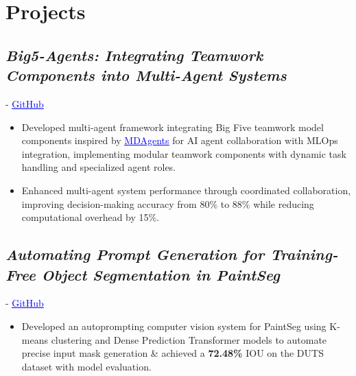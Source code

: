 \section{Projects}
\subsection{\sl {\bfseries Big5-Agents: Integrating Teamwork Components into Multi-Agent Systems}}   -
\href{https://github.com/PranavMishra17/Big5-Agents}{\textcolor{blue}{\underline{GitHub }}}
\begin{itemize}
\item Developed multi-agent framework integrating Big Five teamwork model components inspired by \href{https://github.com/mitmedialab/MDAgents}{\textcolor{blue}{\underline{MDAgents}}} for AI agent collaboration with MLOps integration, implementing modular teamwork components with dynamic task handling and specialized agent roles.
\item Enhanced multi-agent system performance through coordinated collaboration, improving decision-making accuracy from 80\% to 88\% while reducing computational overhead by 15\%.
\end{itemize}
\subsection{\sl {\bfseries Automating Prompt Generation for Training-Free
Object Segmentation in PaintSeg}}    -
\href{https://github.com/PranavMishra17/Auto-Prompting-for-PaintSeg}{\textcolor{blue}{\underline{GitHub }}}
\begin{itemize}
    \item Developed an autoprompting computer vision system for PaintSeg using K-means clustering and Dense Prediction Transformer models to automate precise input mask generation \& achieved a \textbf{72.48\%} IOU on the DUTS dataset with model evaluation.
\end{itemize}
